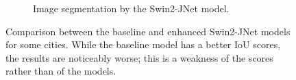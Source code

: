 \begin{figure}[h]
\begin{subfigure}{.5\textwidth}
		\caption{Image segmentation by the Swin2-JNet model.}
	\end{subfigure}
	\caption{Comparison between the baseline and enhanced Swin2-JNet models for some cities. While the baseline model has a better IoU scores, the results are noticeably worse; this is a weakness of the scores rather than of the models.}
\end{figure}
